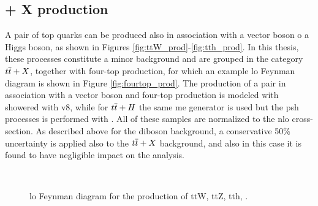 \subsection{\ttbar + X production}

A pair of top quarks can be produced also in association with a vector boson o a Higgs boson, as shown in Figures \ref{fig:ttW_prod}-\ref{fig:tth_prod}.
In this thesis, these processes constitute a minor background and are grouped in the category $t\overline{t}+X$, together with four-top production,
for which an example \gls{lo} Feynman diagram is shown in Figure \ref{fig:fourtop_prod}. 
The production of a \ttbar pair in association with a vector boson and four-top production is modeled with \aNLO showered with \PY v8, while for $t\overline{t}+H$ the same 
\gls{me} generator is used but the \gls{psh} processes is performed with \HWpp. 
All of these samples are normalized to the \gls{nlo} cross-section.
As described above for the diboson background, a conservative 50\% uncertainty is applied also to the 
$t\overline{t}+X$ background, and also in this case it is found to have negligible impact on the analysis. 

\begin{figure}[h!]
\centering 
{}
 \\
\caption{\Gls{lo} Feynman diagram for the production of  ttW,  ttZ,  tth,  \fourtop.}\label{fig:ttX_prod}
\end{figure}

